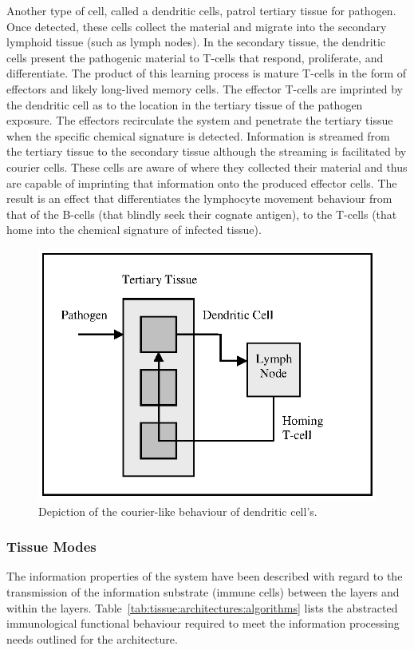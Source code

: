 Another type of cell, called a dendritic cells, patrol tertiary tissue for pathogen. Once detected, these cells collect the material and migrate into the secondary lymphoid tissue (such as lymph nodes). In the secondary tissue, the dendritic cells present the pathogenic material to T-cells that respond, proliferate, and differentiate. The product of this learning process is mature T-cells in the form of effectors and likely long-lived memory cells. The effector T-cells are imprinted by the dendritic cell as to the location in the tertiary tissue of the pathogen exposure. The effectors recirculate the system and penetrate the tertiary tissue when the specific chemical signature is detected. Information is streamed from the tertiary tissue to the secondary tissue although the streaming is facilitated by courier cells. These cells are aware of where they collected their material and thus are capable of imprinting that information onto the produced effector cells. The result is an effect that differentiates the lymphocyte movement behaviour from that of the B-cells (that blindly seek their cognate antigen), to the T-cells (that home into the chemical signature of infected tissue).

\begin{figure}[ht]
	\centering
		\includegraphics[scale=0.75]{Tissues/tissues-model-courier}
	\caption{Depiction of the courier-like behaviour of dendritic cell's.}
	\label{fig:tissues:architecture:courier}
\end{figure}

%
%
\subsubsection{Tissue Modes}
The information properties of the system have been described with regard to the transmission of the information substrate (immune cells) between the layers and within the layers. Table~\ref{tab:tissue:architectures:algorithms} lists the abstracted immunological functional behaviour required to meet the information processing needs outlined for the architecture.


